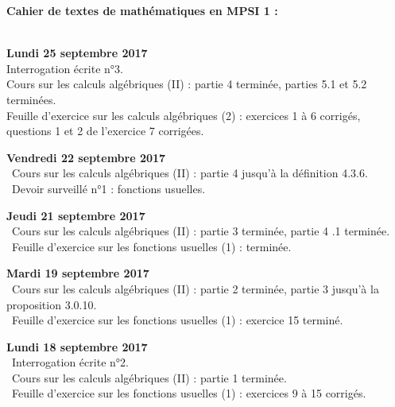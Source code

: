 \documentclass[12pt,a4paper]{article}
\begin{document}
\begin{center}
\Large\bf Cahier de textes de mathématiques en MPSI 1 :
\end{center}
\vspace{1cm}
\vspace{.4cm}\\

\noindent\textbf{Lundi 25 septembre 2017}\\
\bu{} Interrogation écrite n°3.\\
\bu{} Cours sur les calculs algébriques (II) : partie 4 terminée, parties 5.1 et 5.2 terminées. \\
\bu{} Feuille d'exercice sur les calculs algébriques (2) : exercices 1 à 6 corrigés, questions 1 et 2 de l'exercice 7 corrigées.  \\
\vspace{.4cm}

\noindent\textbf{Vendredi 22 septembre 2017}\\
\bu\ Cours sur les calculs algébriques (II) : partie 4 jusqu'à la définition 4.3.6. \\
\bu\ Devoir surveillé n°1 : fonctions usuelles. \\
\vspace{.4cm}

\noindent\textbf{Jeudi 21 septembre 2017}\\
\bu\ Cours sur les calculs algébriques (II) : partie 3 terminée, partie 4 .1 terminée. \\
\bu\ Feuille d'exercice sur les fonctions usuelles (1) : terminée. \\
\vspace{.4cm}

\noindent\textbf{Mardi 19 septembre 2017}\\
\bu\ Cours sur les calculs algébriques (II) : partie 2 terminée, partie 3 jusqu'à la proposition 3.0.10. \\
\bu\ Feuille d'exercice sur les fonctions usuelles (1) : exercice 15 terminé. \\
\vspace{.4cm}

\noindent\textbf{Lundi 18 septembre 2017}\\
\bu\ Interrogation écrite n°2.\\
\bu\ Cours sur les calculs algébriques (II) : partie 1 terminée. \\
\bu\ Feuille d'exercice sur les fonctions usuelles (1) : exercices 9 à 15 corrigés. \\
\vspace{.4cm}
\end{document}
